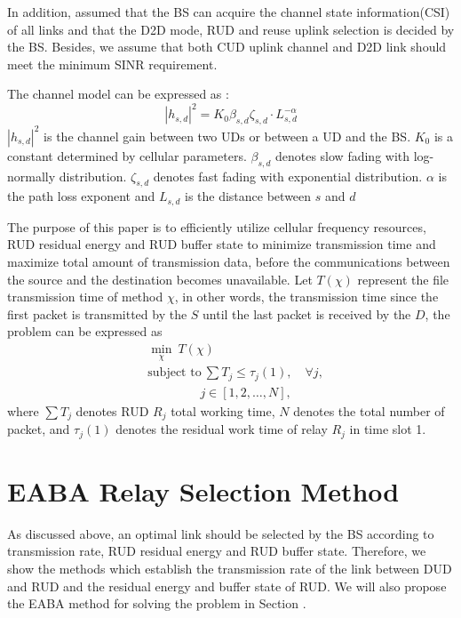 \documentclass[conference]{IEEEtran}
\begin{document}
In addition, assumed that the BS can acquire the channel state information(CSI) of all links and that the D2D mode, RUD and reuse uplink selection is decided by the BS. Besides, we assume that both CUD uplink channel and D2D link should meet the minimum SINR requirement.

The channel model can be expressed as \cite{6560489}:
\begin{equation}
|{h_{s,d}}|^{2} = K_{0}\beta_{s,d}\zeta_{s,d}\cdot L_{s,d}^{-\alpha}
\end{equation}
$|{h_{s,d}}|^{2}$ is the channel gain between two UDs or between a UD and the BS. $K_{0}$ is a constant determined by cellular parameters. $\beta_{s,d}$ denotes slow fading with log-normally distribution. $\zeta_{s,d}$ denotes fast fading with exponential distribution. $\alpha$ is the path loss exponent and $L_{s,d}$ is the distance between $s$ and $d$

The purpose of this paper is to efficiently utilize cellular frequency resources, RUD residual energy and RUD buffer state to minimize transmission time and maximize total amount of transmission data, before the communications between the source and the destination becomes unavailable. Let $T\left(\chi\right)$ represent the file transmission time of method $\chi$, in other words, the transmission time since the first packet is transmitted by the $S$ until the last packet is received by the $D$, the problem can be expressed as
\begin{align}
&\displaystyle \min _{\mathcal {\chi}} ~T(\mathcal {\chi})
\\[-5pt]&\text {subject to} ~ \sum T_{j} \leq \tau_j(1) , \quad \forall j , \tag{2a}
\\[-1.5pt]&\qquad \qquad ~ j\in\left[1,2,\ldots,N\right] , \tag{2b}
\end{align}
where $\sum T_{j}$ denotes RUD $R_{j}$ total working time, $N$ denotes the total number of packet, and $ \tau_j(1)$ denotes the residual work time of relay $R_j$ in time slot 1.

\section{EABA Relay Selection Method}
As discussed above, an optimal link should be selected by the BS according to transmission rate, RUD residual energy and RUD buffer state. Therefore, we show the methods which establish the transmission rate of the link between DUD and RUD and the residual energy and buffer state of RUD. We will also propose the EABA method for solving the problem in Section \uppercase\expandafter{}.
\end{document}
